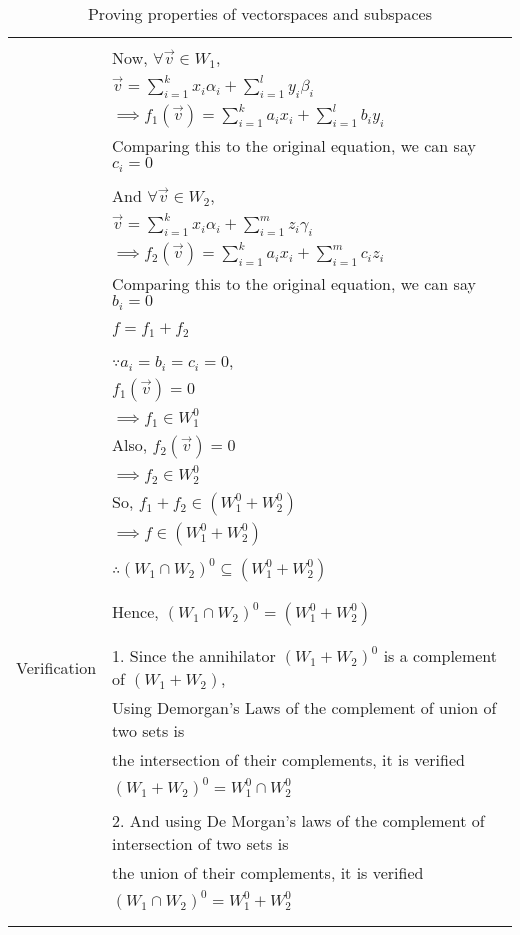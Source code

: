 \documentclass[journal,12pt]{IEEEtran}
\begin{document}
\begin{longtable}{|l|l|}
        & \\
        & Now, $\forall \vec{v} \in W_1$,\\
        & $\vec{v} = \sum_{i=1}^{k} x_i\alpha_i + \sum_{i=1}^{l} y_i\beta_i$\\
        & $\implies f_1(\vec{v}) = \sum_{i=1}^{k} a_ix_i + \sum_{i=1}^{l} b_iy_i$\\
        & Comparing this to the original equation, we can say $c_i = 0$\\
        & \\
        & And $\forall \vec{v} \in W_2$,\\
        & $\vec{v} = \sum_{i=1}^{k} x_i\alpha_i + \sum_{i=1}^{m} z_i\gamma_i$\\
        & $\implies f_2(\vec{v}) = \sum_{i=1}^{k} a_ix_i + \sum_{i=1}^{m} c_iz_i$\\
        & Comparing this to the original equation, we can say $b_i = 0$\\
        & \\
        & $f = f_1 + f_2$\\
        & \\
        & $\because a_i = b_i = c_i = 0$,\\
        & $f_1(\vec{v}) = 0$\\
        & $\implies f_1 \in W_1^0$\\
        & Also, $f_2(\vec{v}) = 0$\\
        & $\implies f_2 \in W_2^0$\\
        & So, $f_1 + f_2 \in (W_1^0 + W_2^0)$\\
        & $\implies f \in (W_1^0 + W_2^0)$\\
        & \\
        & $\therefore (W_1 \cap W_2)^0 \subseteq (W_1^0 + W_2^0)$\\
        & \\
    \hline
        & \\
        & Hence, $(W_1 \cap W_2)^0 = (W_1^0 + W_2^0)$\\
        & \\
    \hline
        & \\
        Verification & 1. Since the annihilator $(W_1 + W_2)^0$ is a complement of $(W_1 + W_2)$,\\
        & Using Demorgan's Laws of the complement of union of two sets is\\
        & the intersection of their complements, it is verified\\
        & $(W_1 + W_2)^0 = W_1^0 \cap W_2^0$\\
        &\\
        & 2. And using De Morgan's laws of the complement of intersection of two sets is\\
        & the union of their complements, it is verified\\
        & $(W_1 \cap W_2)^0 = W_1^0 + W_2^0$\\
        & \\
    \hline
    \caption{Proving properties of vectorspaces and subspaces}
    \label{tab:proof}
\end{longtable}
\end{document}
